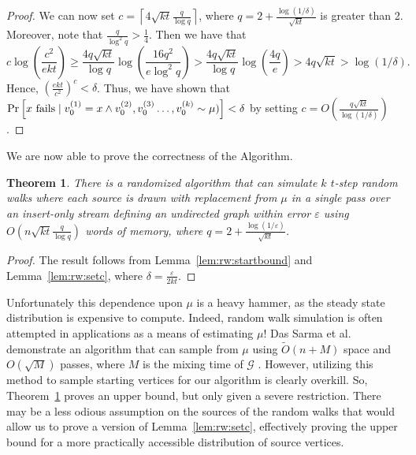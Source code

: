 \documentclass{report}
\newtheorem{theorem}{Theorem}[section]
\begin{document}
\begin{proof}
We can now set $c = \left \lceil 4 \sqrt{kt} \frac{q}{\log q} \right \rceil$, where $q = 2 + \frac{\log (1/\delta)}{\sqrt{kt}}$ is greater than 2. 
Moreover, note that $\frac{q}{\log^2 q} > \frac{1}{4}$.
Then we have that 
%
\begin{equation*}
c \log \left ( \frac{c^2}{ekt} \right ) 
\geq 
\frac{4 q \sqrt{kt}}{\log q} \log \left ( \frac{16q^2}{e \log^2q} \right )
>
\frac{4 q \sqrt{kt}}{\log q} \log \left ( \frac{4q}{e} \right )
> 
4 q\sqrt{kt}
> \log (1/\delta).
\end{equation*}
%
Hence, $\left ( \frac{ekt}{c^2} \right )^c < \delta$.
Thus, we have shown that $\Pr \left [ \textnormal{$x$ fails} \mid v_0^{(1)}  = x \wedge v_0^{(2)}, v_0^{(3)} \dots, v_{0}^{(k)} \sim \mu) \right ] < \delta$ by setting $c = O \left ( \frac{q \sqrt{kt}}{\log (1/\delta)} \right )$.

\end{proof}

We are now able to prove the correctness of the Algorithm.
%
\begin{theorem} \label{thm:rw:serial}
There is a randomized algorithm that can simulate $k$ $t$-step random walks where each source is drawn with replacement from $\mu$ in a single pass over an insert-only stream defining an undirected graph within error $\varepsilon$ using $O \left (n \sqrt{kt} \frac{q}{\log q} \right )$ words of memory, where $q = 2 + \frac{\log(1/\varepsilon)}{\sqrt{kt}}$.
\end{theorem}
%
\begin{proof}
The result follows from Lemma~\ref{lem:rw:startbound} and Lemma~\ref{lem:rw:setc}, where $\delta = \frac{\varepsilon}{2kt}$.
\end{proof}

Unfortunately this dependence upon $\mu$ is a heavy hammer, as the steady state distribution is expensive to compute. 
Indeed, random walk simulation is often attempted in applications as a means of estimating $\mu$!
Das Sarma et al. demonstrate an algorithm that can sample from $\mu$ using $\widetilde{O}(n + M)$ space and $O(\sqrt{M})$ passes, where $M$ is the mixing time of $\mathcal{G}$ \cite{sarma2011estimating}.
However, utilizing this method to sample starting vertices for our algorithm is clearly overkill.
So, Theorem~\ref{thm:rw:serial} proves an upper bound, but only given a severe restriction.
There may be a less odious assumption on the sources of the random walks that would allow us to prove a version of Lemma~\ref{lem:rw:setc}, effectively proving the upper bound for a more practically accessible distribution of source vertices.
\end{document}
